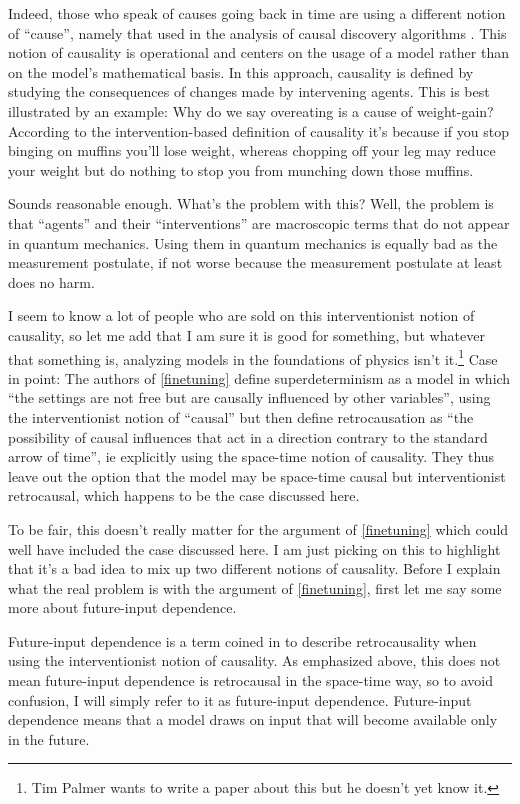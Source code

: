 \documentclass[12pt,A4]{article}
\begin{document}
Indeed, those who speak of causes going back in time are using a different notion of ``cause'', namely that used
in the analysis of causal discovery algorithms \cite{Pearl,Spirtes}. This notion of causality is operational and centers
on the usage of a model rather than on the model's mathematical basis. In this approach, causality is defined 
by studying the consequences of changes made by intervening agents.  This is best illustrated by an example: Why
do we say overeating is a cause of weight-gain? According to the intervention-based definition of causality
it's because if you stop binging on muffins you'll lose weight, whereas chopping
off your leg may reduce your weight but do nothing to stop you from munching down those muffins. 

Sounds reasonable enough. What's the problem with this? Well, the problem is that
``agents'' and their ``interventions'' are macroscopic terms that do not appear in quantum mechanics. 
Using them in quantum mechanics is equally bad as the measurement postulate, if not worse because the measurement postulate
at least does no harm. 

I seem to know a lot of people who are sold on this interventionist notion of causality, so let me add that I am
sure it is good for something, but whatever that something is, analyzing models in the foundations
of physics isn't it.\footnote{Tim Palmer wants to write a paper about this but he doesn't yet know it.} Case in
point: The authors of \ref{finetuning} define superdeterminism as a model in which ``the settings are not free but are
causally influenced by other variables'', using the interventionist notion of ``causal'' but then define retrocausation as
``the possibility of causal influences that act in a direction contrary to the standard arrow
of time'', ie explicitly using the space-time notion of causality. They thus leave out the option that the model may
be space-time causal but interventionist retrocausal, which happens to be the case discussed here. 

To be fair, this doesn't really matter for the argument of \ref{finetuning} which could well have included the
case discussed here. I am just picking on this to highlight that it's a bad idea to mix up two different
notions of causality. Before I explain what the real problem is with the argument of \ref{finetuning}, 
first let me say some more about future-input dependence. 

Future-input dependence is a term coined in \cite{Wharton} to describe retrocausality when using the interventionist notion
of causality. As emphasized above, this does not mean future-input dependence is retrocausal in the space-time way, so to avoid confusion,
I will simply refer to it as future-input dependence. Future-input dependence means that a model draws on 
input that will become available only in the future. 
\end{document}
